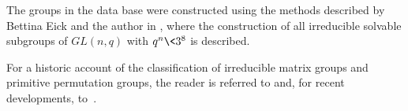 The groups in the {\IRREDSOL} data base were constructed using the methods
described by Bettina Eick and the author in \cite{EH}, where the 
construction of all irreducible solvable subgroups of $GL(n, q)$ with $q^n \< 3^8$
is described.

For a historic account of the classification of irreducible matrix groups and
primitive permutation groups, the reader is referred to \cite{Sho} and, 
for recent developments, to~\cite{EH}.


